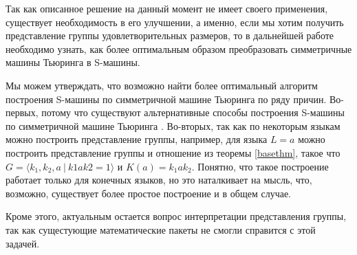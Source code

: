\documentclass[14pt]{matmex-diploma-custom}
\begin{document}
Так как описанное решение на данный момент не имеет своего применения, существует необходимость в его улучшении, а именно, если мы хотим получить представление группы удовлетворительных размеров, то в дальнейшей работе необходимо узнать, как более оптимальным образом преобразовать симметричные машины Тьюринга в S-машины. 

Мы можем утверждать, что возможно найти более оптимальный алгоритм построения S-машины по симметричной машине Тьюринга по ряду причин.
Во-первых, потому что существуют альтернативные способы построения S-машины по симметричной машине Тьюринга \cite{SpaceFunc}.
Во-вторых, так как по некоторым языкам можно построить представление группы, например, для языка $L = {a}$ можно построить представление группы и отношение из теоремы \ref{basethm}, такое что $G=\langle k_1, k_2, a ~|~ k1 a k2 = 1 \rangle$ и $K(a) = k_1 a k_2$. Понятно, что такое построение работает только для конечных языков, но это наталкивает на мысль, что, возможно, существует более простое построение и в общем случае. 

Кроме этого, актуальным остается вопрос интерпретации представления группы, так как сущестующие математические пакеты не смогли справится с этой задачей. 
\end{document}
